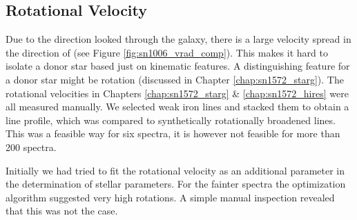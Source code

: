 \subsection{Rotational Velocity}
\label{sec:sn1006_rotvel}
Due to the direction looked through the galaxy, there is a large velocity spread in the direction of  (see Figure \ref{fig:sn1006_vrad_comp}). This makes it hard to isolate a donor star based just on kinematic features. A distinguishing feature for a donor star might be rotation (discussed in Chapter \ref{chap:sn1572_starg}). The rotational velocities in Chapters \ref{chap:sn1572_starg} \& \ref{chap:sn1572_hires} were all measured manually. We selected weak iron lines and stacked them to obtain a line profile, which was compared to synthetically rotationally broadened lines. This was a feasible way for six spectra, it is however not feasible for more than 200 spectra. 

Initially we had tried to fit the rotational velocity as an additional parameter in the determination of stellar parameters. For the fainter spectra the optimization algorithm suggested very high rotations. A simple manual inspection revealed that this was not the case.  

